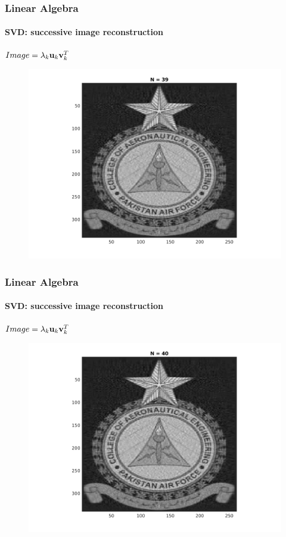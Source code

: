 \documentclass[hyperref={pdfpagelabels=true}]{beamer}
\begin{document}
\begin{frame}
\frametitle{Linear Algebra}
\framesubtitle{SVD: successive image reconstruction} 
\small{
\begin{center}
$Image = \lambda_k{\bf u}_k {\bf v}_k^T$
\end{center}}
\begin{figure}[!htb]
\centering
\includegraphics [scale=0.48]{n/b39.png}
\end{figure}
\end{frame}

\begin{frame}
\frametitle{Linear Algebra}
\framesubtitle{SVD: successive image reconstruction} 
\small{
\begin{center}
$Image = \lambda_k{\bf u}_k {\bf v}_k^T$
\end{center}}
\begin{figure}[!htb]
\centering
\includegraphics [scale=0.48]{n/b40.png}
\end{figure}
\end{frame}
\end{document}

